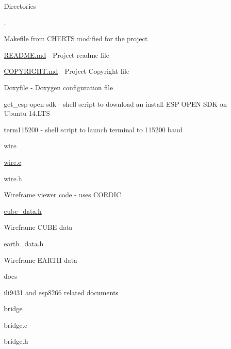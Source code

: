 \begin{DoxyParagraph}{Directories}

\begin{DoxyItemize}
\item .
\begin{DoxyItemize}
\item Makefile from C\-H\-E\-R\-T\-S modified for the project
\item \hyperlink{README_8md}{R\-E\-A\-D\-M\-E.\-md} -\/ Project readme file
\item \hyperlink{COPYRIGHT_8md}{C\-O\-P\-Y\-R\-I\-G\-H\-T.\-md} -\/ Project Copyright file
\item Doxyfile -\/ Doxygen configuration file
\item get\-\_\-esp-\/open-\/sdk -\/ shell script to download an install E\-S\-P O\-P\-E\-N S\-D\-K on Ubuntu 14.\-L\-T\-S
\item term115200 -\/ shell script to launch terminal to 115200 baud
\end{DoxyItemize}
\item wire
\begin{DoxyItemize}
\item \hyperlink{wire_8c}{wire.\-c}
\item \hyperlink{wire_8h}{wire.\-h}
\begin{DoxyItemize}
\item Wireframe viewer code -\/ uses C\-O\-R\-D\-I\-C
\end{DoxyItemize}
\item \hyperlink{cube__data_8h}{cube\-\_\-data.\-h}
\begin{DoxyItemize}
\item Wireframe C\-U\-B\-E data
\end{DoxyItemize}
\item \hyperlink{earth__data_8h}{earth\-\_\-data.\-h}
\begin{DoxyItemize}
\item Wireframe E\-A\-R\-T\-H data
\end{DoxyItemize}
\end{DoxyItemize}
\item docs
\begin{DoxyItemize}
\item ili9431 and esp8266 related documents
\end{DoxyItemize}
\item bridge
\begin{DoxyItemize}
\item bridge.\-c
\item bridge.\-h

\end{DoxyItemize}
\end{DoxyItemize}
\end{DoxyParagraph}
